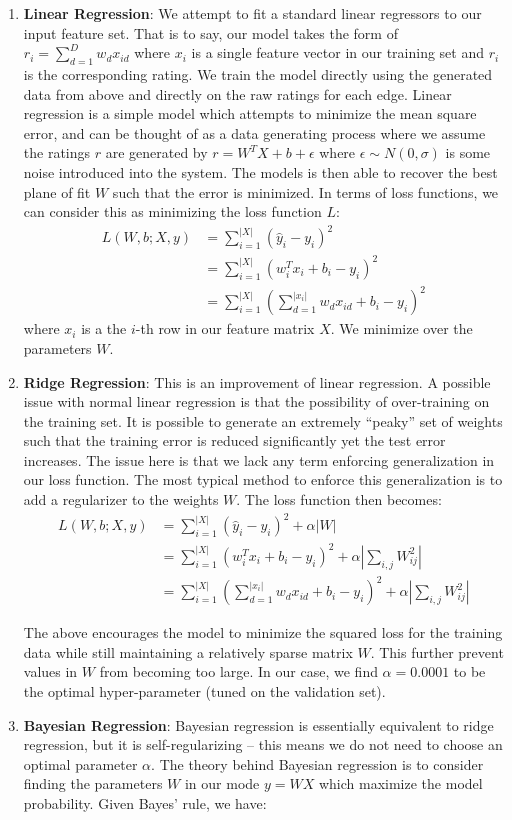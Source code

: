 \documentclass[letterpaper, 10 pt, conference]{ieeeconf}  %
\begin{document}
\begin{enumerate}
\item \textbf{Linear Regression}: We attempt to fit a standard linear regressors to our input feature set. That is to say, our model takes the form of $r_i = \sum_{d=1}^{D} w_d x_{id}$ where $x_i$ is a single feature vector in our training set and $r_i$ is the corresponding rating. We train the model directly using the generated data from above and directly on the raw ratings for each edge. Linear regression is a simple model which attempts to minimize the mean square error, and can be thought of as a data generating process where we assume the ratings $r$ are generated by $r = W^TX + b + \epsilon$ where $\epsilon \sim N(0,\sigma)$ is some noise introduced into the system. The models is then able to recover the best plane of fit $W$ such that the error is minimized. In terms of loss functions, we can consider this as minimizing the loss function $L:$
\begin{align*}
L(W,b; X,y) &= \sum_{i=1}^{|X|} (\hat{y}_i - y_i)^2 \\
&=\sum_{i=1}^{|X|} (w_i^Tx_i + b_i - y_i)^2 \\
&=\sum_{i=1}^{|X|} \left(\sum_{d = 1}^{|x_i|} w_dx_{id} + b_i - y_i\right)^2
\end{align*}
where $x_i$ is a the $i$-th row in our feature matrix $X$. We minimize over the parameters $W$.
\item \textbf{Ridge Regression}: This is an improvement of linear regression. A possible issue with normal linear regression is that the possibility of over-training on the training set. It is possible to generate an extremely ``peaky'' set of weights such that the training error is reduced significantly yet the test error increases. The issue here is that we lack any term enforcing generalization in our loss function. The most typical method to enforce this generalization is to add a regularizer to the weights $W$. The loss function then becomes:
\begin{align*}
L(W, b; X,y) &= \sum_{i=1}^{|X|} (\hat{y}_i - y_i)^2 + \alpha|W|\\
&=\sum_{i=1}^{|X|} (w_i^Tx_i + b_i - y_i)^2 + \alpha \left|\sum_{i,j} W_{ij}^2\right|\\
&=\sum_{i=1}^{|X|} \left(\sum_{d = 1}^{|x_i|} w_dx_{id} + b_i - y_i\right)^2 + \alpha \left|\sum_{i,j} W_{ij}^2\right|
\end{align*}

The above encourages the model to minimize the squared loss for the training data while still maintaining a relatively sparse matrix $W$. This further prevent values in $W$ from becoming too large. In our case, we find $\alpha = 0.0001$ to be the optimal hyper-parameter (tuned on the validation set).
\item \textbf{Bayesian Regression}: Bayesian regression is essentially equivalent to ridge regression, but it is self-regularizing -- this means we do not need to choose an optimal parameter $\alpha.$ The theory behind Bayesian regression is to consider finding the parameters $W$ in our mode $y = WX$ which maximize the model probability. Given Bayes' rule, we have:


\end{enumerate}
\end{document}
